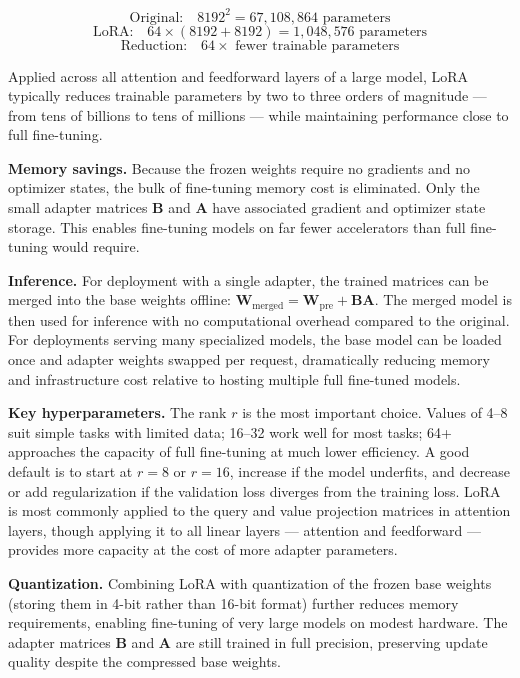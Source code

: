 \documentclass{book}
\begin{document}
\begin{equation}
\text{Original:}\quad 8192^2 = 67{,}108{,}864 \text{ parameters}
\end{equation}
\begin{equation}
\text{LoRA:}\quad 64 \times (8192 + 8192) = 1{,}048{,}576 \text{ parameters}
\end{equation}
\begin{equation}
\text{Reduction:}\quad 64\times \text{ fewer trainable parameters}
\end{equation}

Applied across all attention and feedforward layers of a large model, LoRA
typically reduces trainable parameters by two to three orders of magnitude
--- from tens of billions to tens of millions --- while maintaining
performance close to full fine-tuning.

\textbf{Memory savings.} Because the frozen weights require no gradients
and no optimizer states, the bulk of fine-tuning memory cost is eliminated.
Only the small adapter matrices $\mathbf{B}$ and $\mathbf{A}$ have
associated gradient and optimizer state storage. This enables fine-tuning
models on far fewer accelerators than full fine-tuning would require.

\textbf{Inference.} For deployment with a single adapter, the trained
matrices can be merged into the base weights offline:
$\mathbf{W}_{\text{merged}} = \mathbf{W}_{\text{pre}} + \mathbf{B}
\mathbf{A}$. The merged model is then used for inference with no
computational overhead compared to the original. For deployments serving
many specialized models, the base model can be loaded once and adapter
weights swapped per request, dramatically reducing memory and
infrastructure cost relative to hosting multiple full fine-tuned models.

\textbf{Key hyperparameters.} The rank $r$ is the most important
choice. Values of 4--8 suit simple tasks with limited data; 16--32
work well for most tasks; 64+ approaches the capacity of full
fine-tuning at much lower efficiency. A good default is to start at
$r = 8$ or $r = 16$, increase if the model underfits, and decrease
or add regularization if the validation loss diverges from the
training loss. LoRA is most commonly applied to the query and value
projection matrices in attention layers, though applying it to all
linear layers --- attention and feedforward --- provides more capacity
at the cost of more adapter parameters.

\textbf{Quantization.} Combining LoRA with quantization of the frozen
base weights (storing them in 4-bit rather than 16-bit format) further
reduces memory requirements, enabling fine-tuning of very large models
on modest hardware. The adapter matrices $\mathbf{B}$ and $\mathbf{A}$
are still trained in full precision, preserving update quality despite
the compressed base weights.
\end{document}
